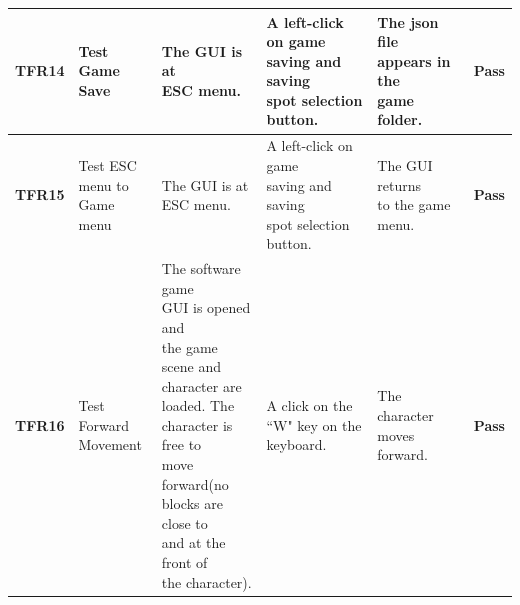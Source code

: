 \documentclass[12pt, titlepage]{article}
\begin{document}
\begin{center}
\begin{longtable}[!bpht]{|m{1.3cm}|m{2.3cm}|m{3.4cm}|m{3.4cm}|m{3.4cm}|m{1cm}|}
\textbf{TFR14} & \makecell[ml]{Test Game\\ Save} & \makecell[ml]{The GUI is at\\ ESC menu.} & \makecell[ml]{A \hspace{-0.5mm}left-click \hspace{-0.5mm}on \hspace{-0.5mm}game\\ saving and saving\\ spot selection\\ button.} & \makecell[ml]{The json file\\ appears in the\\ game folder.} & \textbf{Pass}\\\hline

\textbf{TFR15} & \makecell[ml]{Test ESC\\ menu to\\ Game menu} & \makecell[ml]{The GUI is at\\ ESC menu.} & \makecell[ml]{A \hspace{-0.5mm}left-click \hspace{-0.5mm}on \hspace{-0.5mm}game\\ saving and saving\\ spot selection\\ button.} & \makecell[ml]{The GUI returns\\ to the game menu.} & \textbf{Pass}\\\hline


\textbf{TFR16} & \makecell[ml]{Test\\ Forward\\ Movement} & \makecell[ml]{The software game\\ GUI is opened and\\ the game scene and\\ character are\\ loaded. The\\ character is free to\\ move forward(no\\ blocks are close to\\ and at the front of\\ the character).} & \makecell[ml]{A click on the\\ ``W" key on the\\ keyboard.} & \makecell[ml]{The character\\ moves forward.} & \textbf{Pass}\\\hline


\end{longtable}
\end{center}
\end{document}
